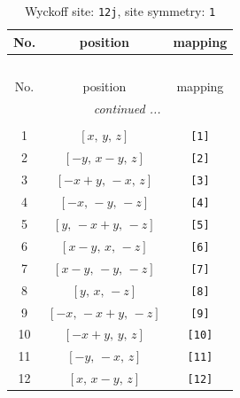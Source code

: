 \documentclass[fleqn,8pt]{jsarticle}
\begin{document}
\begin{longtable}{ccc}
\caption{Wyckoff site: {\tt 12j}, site symmetry: {\tt 1}}
 \\
 \hline \hline
No. & position & mapping \\ \hline \endfirsthead

\multicolumn{2}{l}{\tablename\ \thetable{}} \\
 \hline \hline
No. & position & mapping \\ \hline \endhead

 \hline \hline
\multicolumn{2}{r}{\footnotesize\it continued ...} \\ \endfoot

 \hline \hline
\multicolumn{2}{r}{} \\ \endlastfoot

1 & $\left[ x,\, y,\, z \right]$ & {\tt [1]} \\ \hline
2 & $\left[ - y,\, x - y,\, z \right]$ & {\tt [2]} \\ \hline
3 & $\left[ - x + y,\, - x,\, z \right]$ & {\tt [3]} \\ \hline
4 & $\left[ - x,\, - y,\, - z \right]$ & {\tt [4]} \\ \hline
5 & $\left[ y,\, - x + y,\, - z \right]$ & {\tt [5]} \\ \hline
6 & $\left[ x - y,\, x,\, - z \right]$ & {\tt [6]} \\ \hline
7 & $\left[ x - y,\, - y,\, - z \right]$ & {\tt [7]} \\ \hline
8 & $\left[ y,\, x,\, - z \right]$ & {\tt [8]} \\ \hline
9 & $\left[ - x,\, - x + y,\, - z \right]$ & {\tt [9]} \\ \hline
10 & $\left[ - x + y,\, y,\, z \right]$ & {\tt [10]} \\ \hline
11 & $\left[ - y,\, - x,\, z \right]$ & {\tt [11]} \\ \hline
12 & $\left[ x,\, x - y,\, z \right]$ & {\tt [12]} \\
\end{longtable}
\end{document}
